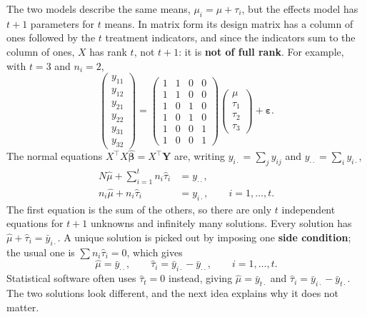 \documentclass[11pt,a4paper]{article}
\numberwithin{equation}{section}
\theoremstyle{definition}
\begin{document}
The two models describe the same means, $\mu_i = \mu + \tau_i$, but the effects model has $t + 1$ parameters for $t$ means. In matrix form its design
matrix has a column of ones followed by the $t$ treatment indicators, and since the indicators sum to the column of ones, $X$ has rank $t$, not $t + 1$:
it is \textbf{not of full rank}. For example, with $t = 3$ and $n_i = 2$,
\[
\begin{pmatrix} y_{11} \\ y_{12} \\ y_{21} \\ y_{22} \\ y_{31} \\ y_{32} \end{pmatrix}
= \begin{pmatrix} 1 & 1 & 0 & 0 \\ 1 & 1 & 0 & 0 \\ 1 & 0 & 1 & 0 \\ 1 & 0 & 1 & 0 \\ 1 & 0 & 0 & 1 \\ 1 & 0 & 0 & 1 \end{pmatrix}
\begin{pmatrix} \mu \\ \tau_1 \\ \tau_2 \\ \tau_3 \end{pmatrix} + \boldsymbol\varepsilon .
\]
The normal equations $X^\top X\hat{\boldsymbol\beta} = X^\top\mathbf Y$ are, writing $y_{i\cdot} = \sum_jy_{ij}$ and $y_{\cdot\cdot} = \sum_iy_{i\cdot}$,
\begin{align*}
N\hat\mu + \sum_{i=1}^tn_i\hat\tau_i &= y_{\cdot\cdot} , \\
n_i\hat\mu + n_i\hat\tau_i &= y_{i\cdot} , \qquad i = 1, \dots, t .
\end{align*}
The first equation is the sum of the others, so there are only $t$ independent equations for $t + 1$ unknowns and infinitely many solutions. Every
solution has $\hat\mu + \hat\tau_i = \bar y_{i\cdot}$. A unique solution is picked out by imposing one \textbf{side condition}; the usual one is $\sum n_i\hat\tau_i = 0$, which gives
\[
\hat\mu = \bar y_{\cdot\cdot} , \qquad \hat\tau_i = \bar y_{i\cdot} - \bar y_{\cdot\cdot} , \qquad i = 1, \dots, t .
\]
Statistical software often uses $\hat\tau_t = 0$ instead, giving $\hat\mu = \bar y_{t\cdot}$ and $\hat\tau_i = \bar y_{i\cdot} - \bar y_{t\cdot}$. The two solutions look different, and the next idea
explains why it does not matter.
\end{document}
